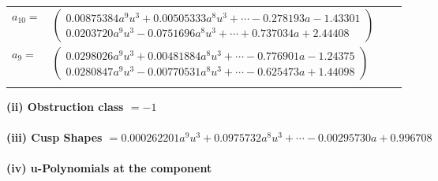 \documentclass[1p]{elsarticle_modified}
\theoremstyle{definition}
\begin{document}
\begin{tabular}{m{7pt} m{180pt} m{7pt} m{180pt} }
\flushright $a_{10}=$&$\begin{pmatrix}0.00875384 a^{9} u^{3}+0.00505333 a^{8} u^{3}+\cdots-0.278193 a-1.43301\\0.0203720 a^{9} u^{3}-0.0751696 a^{8} u^{3}+\cdots+0.737034 a+2.44408\end{pmatrix}$ \\
\flushright $a_{9}=$&$\begin{pmatrix}0.0298026 a^{9} u^{3}+0.00481884 a^{8} u^{3}+\cdots-0.776901 a-1.24375\\0.0280847 a^{9} u^{3}-0.00770531 a^{8} u^{3}+\cdots-0.625473 a+1.44098\end{pmatrix}$\\&\end{tabular}
\flushleft \textbf{(ii) Obstruction class $= -1$}\\~\\
\flushleft \textbf{(iii) Cusp Shapes $= 0.000262201 a^{9} u^{3}+0.0975732 a^{8} u^{3}+\cdots-0.00295730 a+0.996708$}\\~\\
\newpage\renewcommand{\arraystretch}{1}
\flushleft \textbf{(iv) u-Polynomials at the component}\newline \\
\end{document}
